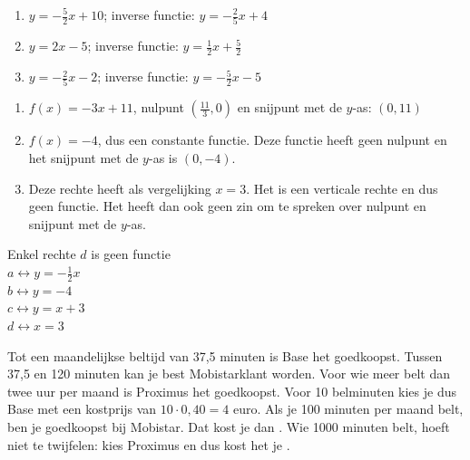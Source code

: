 \begin{Oplossing}{2.8}
\begin{enumerate}
\item $y=-\frac52 x +10$; inverse functie: $y=-\frac25 x +4$
\item $y=2x-5$; inverse functie: $y=\frac12 x+\frac52$
\item $y=-\frac25x-2$; inverse functie: $y=-\frac52x-5$
\end{enumerate}
\end{Oplossing}
\begin{Oplossing}{3.1}
\begin{enumerate}
\item $f(x)=-3x+11$, nulpunt $(\frac{11}{3}, 0)$ en snijpunt met de $y$-as: $(0,11)$
\item $f(x)=-4$, dus een constante functie. Deze functie heeft geen nulpunt en het snijpunt met de $y$-as is $(0,-4)$.
\item Deze rechte heeft als vergelijking $x=3$. Het is een verticale rechte en dus geen functie. Het heeft dan ook geen zin om te spreken over nulpunt en snijpunt met de $y$-as.
\end{enumerate}
     
\end{Oplossing}
\begin{Oplossing}{3.2}
 Enkel rechte $d$ is geen functie \\
$a\leftrightarrow y=-\frac{1}{2}x$\\
$b \leftrightarrow y=-4 $\\
$c \leftrightarrow y=x+3$\\
$d \leftrightarrow x=3$
\end{Oplossing}
\begin{Oplossing}{3.3}
Tot een maandelijkse beltijd van 37,5 minuten is Base het goedkoopst. Tussen 37,5 en 120 minuten kan je best Mobistarklant worden. Voor wie meer belt dan twee uur per maand is Proximus het goedkoopst.
Voor 10 belminuten kies je dus Base met een kostprijs van $10\cdot 0,40=4$ euro. Als je 100 minuten per maand belt, ben je goedkoopst bij Mobistar. Dat kost je dan . Wie 1000 minuten belt, hoeft niet te twijfelen: kies Proximus en dus kost het je .
\end{Oplossing}
